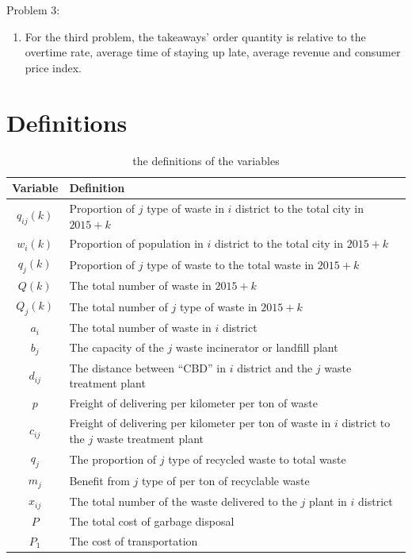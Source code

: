 \documentclass[UTF8]{article}
\begin{document}
Problem 3:\\
\begin{enumerate}
\item For the third problem, the takeaways’ order quantity is relative to the overtime rate, average time of staying up late, average revenue and consumer price index.
\end{enumerate}
\newpage
\section{Definitions}
\begin{table}[hpt]
\caption{the definitions of the variables}
\begin{center}
\begin{tabular}{cl}
\hline
Variable&Definition \\
\hline
\(q_{ij}(k)\) &Proportion of \(j\) type of waste in \(i\) district to the total city in \(2015+k\)\\
\hline
\(w_i(k)\)&Proportion of population in \(i\) district to the total city in \(2015+k\)\\
\hline
\(q_j(k)\)&Proportion of \(j\) type of waste to the total waste in \(2015+k\)\\
\hline
\(Q(k)\)&The total number of waste in \(2015+k\)\\
\hline
\(Q_j(k)\)&The total number of \(j\) type of waste in \(2015+k\)\\
\hline
\(a_i\)&The total number of waste in \(i\) district\\
\hline
\(b_j\)&The capacity of the \(j\) waste incinerator or landfill plant\\
\hline
\(d_{ij}\)&The distance between ``CBD'' in \(i\) district and the \(j\) waste treatment plant\\
\hline
\(p\)&Freight of delivering per kilometer per ton of waste\\
\hline
\(c_{ij}\)&Freight of delivering per kilometer per ton of waste in \(i\) district to the \(j\) waste treatment plant\\
\hline
\(q_j\)&The proportion of \(j\) type of recycled waste to total waste\\
\hline
\(m_j\)&Benefit from \(j\) type of per ton of recyclable waste\\
\hline
\(x_{ij}\)&The total number of the waste delivered to the \(j\) plant in \(i\) district\\
\hline
\(P\)&The total cost of garbage disposal\\
\hline
\(P_1\)&The cost of transportation\\

\end{tabular}
\end{center}
\end{table}
\end{document}
